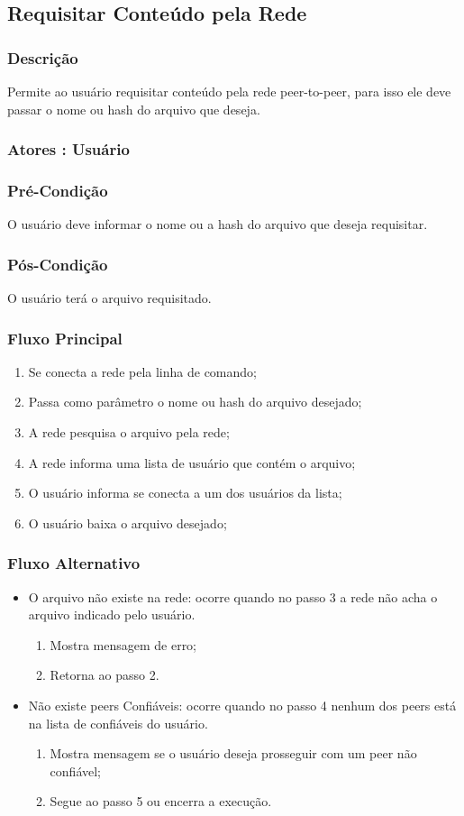 \subsection{Requisitar Conteúdo pela Rede}
\subsubsection{Descrição}
Permite ao usuário requisitar conteúdo pela rede peer-to-peer, para isso ele deve passar o nome ou hash do arquivo que deseja.
\subsubsection{Atores : Usuário}
\subsubsection{Pré-Condição}
O usuário deve informar o nome ou a hash do arquivo que deseja requisitar.
\subsubsection{Pós-Condição}
O usuário terá o arquivo requisitado.
\subsubsection{Fluxo Principal}
\begin{enumerate}
    \item Se conecta a rede pela linha de comando;
    \item Passa como parâmetro o nome ou hash do arquivo desejado;
    \item A rede pesquisa o arquivo pela rede;
    \item A rede informa uma lista de usuário que contém o arquivo;
    \item O usuário informa se conecta a um dos usuários da lista;
    \item O usuário baixa o arquivo desejado;
\end{enumerate}
\subsubsection{Fluxo Alternativo}
\begin{itemize}
    \item O arquivo não existe na rede: ocorre quando no passo 3 a rede não acha o arquivo indicado pelo usuário.
    \begin{enumerate}
        \item Mostra mensagem de erro;
        \item Retorna ao passo 2.
    \end{enumerate}
    \item Não existe peers Confiáveis: ocorre quando no passo 4 nenhum dos peers está na lista de confiáveis do usuário.
    \begin{enumerate}
        \item Mostra mensagem se o usuário deseja prosseguir com um peer não confiável;
        \item Segue ao passo 5 ou encerra a execução.
    \end{enumerate}
\end{itemize}


